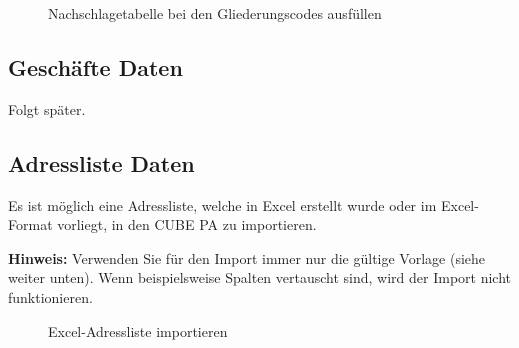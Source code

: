 \begin{figure}[H]
\caption{Nachschlagetabelle bei den Gliederungscodes ausfüllen}
\end{figure}

\subsection{Geschäfte Daten}

Folgt später.

\subsection{Adressliste Daten}

Es ist möglich eine Adressliste, welche in Excel erstellt wurde oder im Excel-Format vorliegt, in den CUBE PA zu importieren. 

\vspace{\baselineskip}

\textbf{Hinweis:} Verwenden Sie für den Import immer nur die gültige Vorlage (siehe weiter unten). Wenn beispielsweise Spalten vertauscht sind, wird der Import nicht funktionieren.

\begin{figure}[H]
\caption{Excel-Adressliste importieren}
\end{figure}

